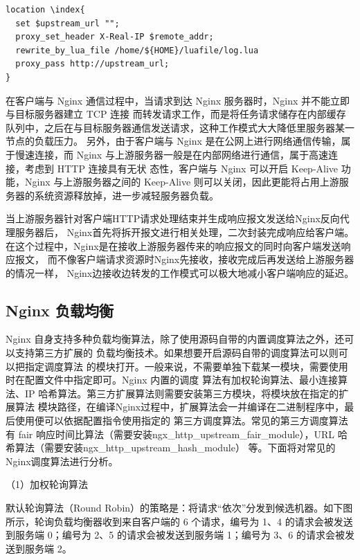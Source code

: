 \noindent \begin{lstlisting}[caption={Nginx 反向代理默认配置}]
location \index{
  set $upstream_url "";
  proxy_set_header X-Real-IP $remote_addr;
  rewrite_by_lua_file /home/${HOME}/luafile/log.lua
  proxy_pass http://upstream_url;
}
\end{lstlisting}

在客户端与 Nginx 通信过程中，当请求到达 Nginx 服务器时，Nginx 并不能立即与目标服务器建立 TCP 连接
而转发请求工作，而是将任务请求储存在内部缓存队列中，之后在与目标服务器通信发送请求，这种工作模式大大降低里服务器某一节点的负载压力。
另外，由于客户端与 Nginx 是在公网上进行网络通信传输，属于慢速连接，而 Nginx 与上游服务器一般是在内部网络进行通信，属于高速连接，考虑到 HTTP 连接具有无状
态性，客户端与 Nginx 可以开启 Keep-Alive 功能，Nginx 与上游服务器之间的 Keep-Alive
则可以关闭，因此更能将占用上游服务器的系统资源释放掉，进一步减轻服务器负载。

当上游服务器针对客户端HTTP请求处理结束并生成响应报文发送给Nginx反向代理服务器后，
Nginx首先将拆开报文进行相关处理，二次封装完成响应给客户端。
在这个过程中，Nginx是在接收上游服务器传来的响应报文的同时向客户端发送响应报文，
而不像客户端请求资源时Nginx先接收，接收完成后再发送给上游服务器的情况一样，
Nginx边接收边转发的工作模式可以极大地减小客户端响应的延迟\cite{邓仲举2012高可靠性集群部署的设计与实现}。

\subsection{Nginx 负载均衡}

Nginx 自身支持多种负载均衡算法，除了使用源码自带的内置调度算法之外，还可以支持第三方扩展的
负载均衡技术\cite{sufiev2016dynamic}。如果想要开启源码自带的调度算法可以则可以把指定调度算法
的模块打开。一般来说，不需要单独下载某一模块，需要使用时在配置文件中指定即可。Nginx 内置的调度
算法有加权轮询算法、最小连接算法、IP 哈希算法。第三方扩展算法则需要安装第三方模块，将模块放在指定的扩展算法
模块路径，在编译Nginx过程中，扩展算法会一并编译在二进制程序中，最后使用便可以依据配置指令使用指定的
第三方调度算法。常见的第三方调度算法有 fair 响应时间比算法（需要安装ngx\_http\_upstream\_fair\_module），URL 哈希算法（需要安装ngx\_http\_upstream\_hash\_module）
等。下面将对常见的Nginx调度算法进行分析。

（1）加权轮询算法

默认轮询算法（Round Robin）的策略是：将请求“依次”分发到候选机器。如下图所示，轮询负载均衡器收到来自客户端的 6 个请求，编号为 1、4 的请求会被发送到服务端 0；编号为 2、5 的请求会被发送到服务端 1；编号为 3、6 的请求会被发送到服务端 2。

